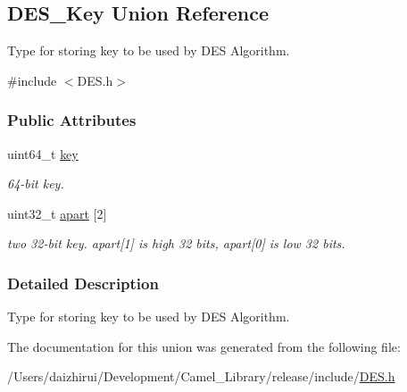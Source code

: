 \hypertarget{a00134}{}\subsection{D\+E\+S\+\_\+\+Key Union Reference}
\label{a00134}


Type for storing key to be used by D\+ES Algorithm.  




{\ttfamily \#include $<$D\+E\+S.\+h$>$}

\subsubsection*{Public Attributes}
\begin{DoxyCompactItemize}
\item 
\mbox{\label{a00134_a48b5dadf7decf3076826072563041f1b}} 
uint64\+\_\+t \mbox{\hyperlink{a00134_a48b5dadf7decf3076826072563041f1b}{key}}
\begin{DoxyCompactList}\small\item\em 64-\/bit key. \end{DoxyCompactList}\item 
\mbox{\label{a00134_a3e14395e8ac22e9e775a243041daaeeb}} 
uint32\+\_\+t \mbox{\hyperlink{a00134_a3e14395e8ac22e9e775a243041daaeeb}{apart}} \mbox{[}2\mbox{]}
\begin{DoxyCompactList}\small\item\em two 32-\/bit key. apart\mbox{[}1\mbox{]} is high 32 bits, apart\mbox{[}0\mbox{]} is low 32 bits. \end{DoxyCompactList}\end{DoxyCompactItemize}


\subsubsection{Detailed Description}
Type for storing key to be used by D\+ES Algorithm. 

The documentation for this union was generated from the following file\+:\begin{DoxyCompactItemize}
\item 
/\+Users/daizhirui/\+Development/\+Camel\+\_\+\+Library/release/include/\mbox{\hyperlink{a00005}{D\+E\+S.\+h}}\end{DoxyCompactItemize}
